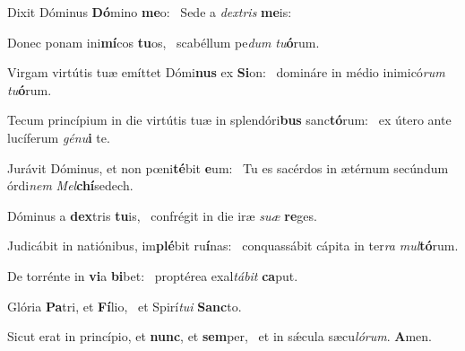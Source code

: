 \item Dixit Dóminus \textbf{Dó}mino \textbf{me}o:~\psstar{} Sede a \textit{dex}\textit{tris} \textbf{me}is:

\item Donec ponam ini\textbf{mí}cos \textbf{tu}os,~\psstar{} scabéllum pe\textit{dum} \textit{tu}\textbf{ó}rum.

\item Virgam virtútis tuæ emíttet Dómi\textbf{nus} ex \textbf{Si}on:~\psstar{} domináre in médio inimicó\textit{rum} \textit{tu}\textbf{ó}rum.

\item Tecum princípium in die virtútis tuæ in splendóri\textbf{bus} sanc\textbf{tó}rum:~\psstar{} ex útero ante lucíferum \textit{gé}\textit{nu}\textbf{i} te.

\item Jurávit Dóminus, et non pœni\textbf{té}bit \textbf{e}um:~\psstar{} Tu es sacérdos in ætérnum secúndum órdi\textit{nem} \textit{Mel}\textbf{chí}sedech.

\item Dóminus a \textbf{dex}tris \textbf{tu}is,~\psstar{} confrégit in die iræ \textit{su}\textit{æ} \textbf{re}ges.

\item Judicábit in natiónibus, im\textbf{plé}bit ru\textbf{í}nas:~\psstar{} conquassábit cápita in ter\textit{ra} \textit{mul}\textbf{tó}rum.

\item De torrénte in \textbf{vi}a \textbf{bi}bet:~\psstar{} proptérea exal\textit{tá}\textit{bit} \textbf{ca}put.

\item Glória \textbf{Pa}tri, et \textbf{Fí}lio,~\psstar{} et Spirí\textit{tu}\textit{i} \textbf{Sanc}to.

\item Sicut erat in princípio, et \textbf{nunc}, et \textbf{sem}per,~\psstar{} et in sǽcula sæcu\textit{ló}\textit{rum}. \textbf{A}men.